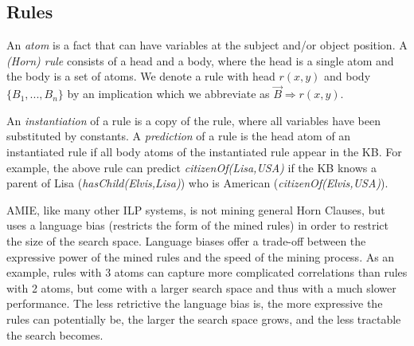 \subsection{Rules}

      

An \emph{atom} is a fact that can have variables at the subject and/or object position.
A \emph{(Horn) rule} consists of a head and a body, where the head is a single atom and the body is a set of atoms.
We denote a rule with head $r(x,y)$ and body $\{B_1,..., B_n\}$ by an implication
which we abbreviate as $\vec{B} \Rightarrow r(x,y)$.

An \emph{instantiation} of a rule is a copy of the rule, where all variables have been substituted by constants.
A \emph{prediction} of a rule is the head atom of an instantiated rule if all body atoms of the instantiated rule appear in the KB.
For example, the above rule can predict \emph{citizenOf(Lisa,USA)} if the KB knows a parent of Lisa (\emph{hasChild(Elvis,Lisa)}) who is American (\emph{citizenOf(Elvis,USA)}).

AMIE, like many other ILP systems, is not mining general Horn Clauses, but uses a language bias (restricts the form of the mined rules) 
in order to restrict the size of the search space. 
Language biases offer a trade-off between the expressive power of the mined rules and the speed of the mining process.
As an example, rules with 3 atoms can capture more complicated correlations than rules with 2 atoms, but come with a larger search space and thus with a much slower performance.
The less retrictive the language bias is,
the more expressive the rules can potentially be, the larger the search space grows, and the less tractable the search becomes.

